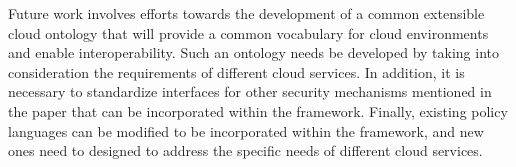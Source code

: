\documentclass[10pt, conference, compsocconf]{IEEEtran}
\begin{document}
Future work involves efforts towards the development of a common extensible cloud ontology that will provide a common vocabulary for cloud environments and enable interoperability. Such an ontology needs be developed by taking into consideration the requirements of different cloud services. In addition, it is necessary to standardize interfaces for other security mechanisms mentioned in the paper that can be incorporated within the framework. Finally, existing policy languages can be modified to be incorporated within the framework, and new ones need to designed to address the specific needs of different cloud services. 


%
%



%
%
\end{document}
